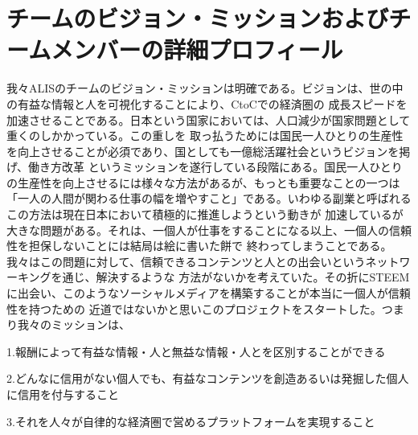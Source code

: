 \documentclass{jsarticle}
\begin{document}
\section{チームのビジョン・ミッションおよびチームメンバーの詳細プロフィール}
我々ALISのチームのビジョン・ミッションは明確である。ビジョンは、世の中の有益な情報と人を可視化することにより、CtoCでの経済圏の
成長スピードを加速させることである。日本という国家においては、人口減少が国家問題として重くのしかかっている。この重しを
取っ払うためには国民一人ひとりの生産性を向上させることが必須であり、国としても一億総活躍社会というビジョンを掲げ、働き方改革
というミッションを遂行している段階にある。国民一人ひとりの生産性を向上させるには様々な方法があるが、もっとも重要なことの一つは
「一人の人間が関わる仕事の幅を増やすこと」である。いわゆる副業と呼ばれるこの方法は現在日本において積極的に推進しようという動きが
加速しているが大きな問題がある。それは、一個人が仕事をすることになる以上、一個人の信頼性を担保しないことには結局は絵に書いた餅で
終わってしまうことである。我々はこの問題に対して、信頼できるコンテンツと人との出会いというネットワーキングを通じ、解決するような
方法がないかを考えていた。その折にSTEEMに出会い、このようなソーシャルメディアを構築することが本当に一個人が信頼性を持つための
近道ではないかと思いこのプロジェクトをスタートした。つまり我々のミッションは、

1.報酬によって有益な情報・人と無益な情報・人とを区別することができる

2.どんなに信用がない個人でも、有益なコンテンツを創造あるいは発掘した個人に信用を付与すること

3.それを人々が自律的な経済圏で営めるプラットフォームを実現すること
\end{document}
